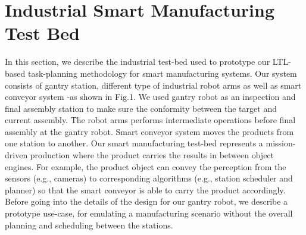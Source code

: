 \documentclass[3p,twocolumn,times,procedia]{elsarticle}
\begin{document}
\section{Industrial Smart Manufacturing Test Bed} \label{sec:use-case}
In this section, we describe the industrial test-bed used to prototype our LTL-based task-planning methodology for smart manufacturing systems. Our system consists of gantry station, different type of industrial robot arms as well as smart conveyor system -as shown in Fig.1. We used gantry robot as an inspection and final assembly station to make sure the conformity between the target and current assembly. The robot arms performs intermediate operations before final assembly at the gantry robot. Smart conveyor system moves the products from one station to another. Our smart manufacturing test-bed represents a mission-driven production where the product carries the results in between object engines. For example, the product object can convey the perception from the sensors (e.g., cameras) to corresponding algorithms (e.g., station scheduler and planner) so that the smart conveyor is able to carry the product accordingly. Before going into the details of the design for our gantry robot, we describe a prototype use-case, for emulating a manufacturing scenario without the overall planning and scheduling between the stations.
\end{document}
